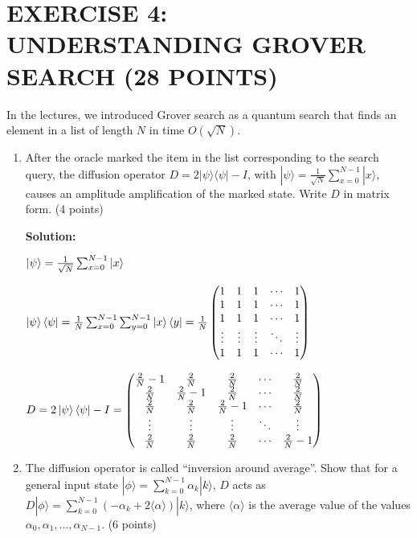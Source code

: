 \documentclass[12pt]{article}
\begin{document}
\section{EXERCISE 4: UNDERSTANDING GROVER SEARCH (28 POINTS)}
In the lectures, we introduced Grover search as a quantum search that finds an element in a list of length $N$ in time $O(\sqrt{N})$.
\begin{enumerate}
    \item After the oracle marked the item in the list corresponding to the search query, the diffusion operator $D = 2|\psi\rangle\langle\psi| - I$, with $|\psi\rangle = \frac{1}{\sqrt{N}}\sum_{x=0}^{N-1}|x\rangle$, causes an amplitude amplification of the marked state. Write $D$ in matrix form. (4 points)

          \textbf{Solution:}

          $\ket{\psi} = \frac{1}{\sqrt{N}}\sum_{x=0}^{N-1}\ket{x}$

          $\ket{\psi}\bra{\psi} = \frac{1}{N}\sum_{x=0}^{N-1}\sum_{y=0}^{N-1}\ket{x}\bra{y}=\frac{1}{N}\begin{pmatrix}
                  1      & 1      & 1      & \cdots & 1      \\
                  1      & 1      & 1      & \cdots & 1      \\
                  1      & 1      & 1      & \cdots & 1      \\
                  \vdots & \vdots & \vdots & \ddots & \vdots \\
                  1      & 1      & 1      & \cdots & 1
              \end{pmatrix}$


          $D = 2\ket{\psi}\bra{\psi}-I = \begin{pmatrix}
                  \frac{2}{N}-1 & \frac{2}{N}   & \frac{2}{N}   & \cdots & \frac{2}{N}   \\
                  \frac{2}{N}   & \frac{2}{N}-1 & \frac{2}{N}   & \cdots & \frac{2}{N}   \\
                  \frac{2}{N}   & \frac{2}{N}   & \frac{2}{N}-1 & \cdots & \frac{2}{N}   \\
                  \vdots        & \vdots        & \vdots        & \ddots & \vdots        \\
                  \frac{2}{N}   & \frac{2}{N}   & \frac{2}{N}   & \cdots & \frac{2}{N}-1
              \end{pmatrix}$
    \item The diffusion operator is called “inversion around average”. Show that for a general input state $|\phi\rangle = \sum_{k=0}^{N-1} \alpha_k |k\rangle$, $D$ acts as $D|\phi\rangle = \sum_{k=0}^{N-1} (-\alpha_k + 2\langle\alpha\rangle) |k\rangle$, where $\langle\alpha\rangle$ is the average value of the values $\alpha_0, \alpha_1, ..., \alpha_{N-1}$. (6 points)




\end{enumerate}
\end{document}
